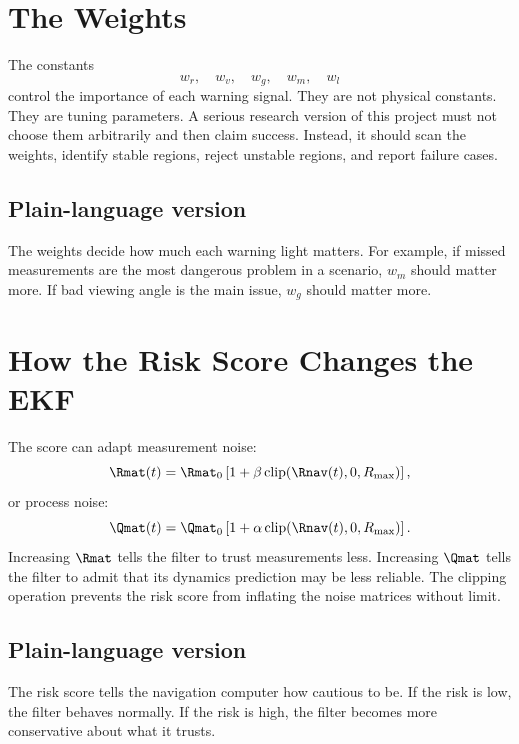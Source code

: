 \documentclass[11pt]{article}
\begin{document}
\section{The Weights}

The constants
\begin{equation}
  w_r,\quad w_v,\quad w_g,\quad w_m,\quad w_l
\end{equation}
control the importance of each warning signal. They are not physical constants.
They are tuning parameters. A serious research version of this project must
not choose them arbitrarily and then claim success. Instead, it should scan
the weights, identify stable regions, reject unstable regions, and report
failure cases.

\subsection*{Plain-language version}

The weights decide how much each warning light matters. For example, if missed
measurements are the most dangerous problem in a scenario, $w_m$ should matter
more. If bad viewing angle is the main issue, $w_g$ should matter more.

\section{How the Risk Score Changes the EKF}

The score can adapt measurement noise:
\begin{equation}
  \Rmat(t)
  =
  \Rmat_0
  \left[
  1+\beta\,\mathrm{clip}(\Rnav(t),0,R_{\max})
  \right],
\end{equation}
or process noise:
\begin{equation}
  \Qmat(t)
  =
  \Qmat_0
  \left[
  1+\alpha\,\mathrm{clip}(\Rnav(t),0,R_{\max})
  \right].
\end{equation}
Increasing $\Rmat$ tells the filter to trust measurements less. Increasing
$\Qmat$ tells the filter to admit that its dynamics prediction may be less
reliable. The clipping operation prevents the risk score from inflating the
noise matrices without limit.

\subsection*{Plain-language version}

The risk score tells the navigation computer how cautious to be. If the risk
is low, the filter behaves normally. If the risk is high, the filter becomes
more conservative about what it trusts.
\end{document}
